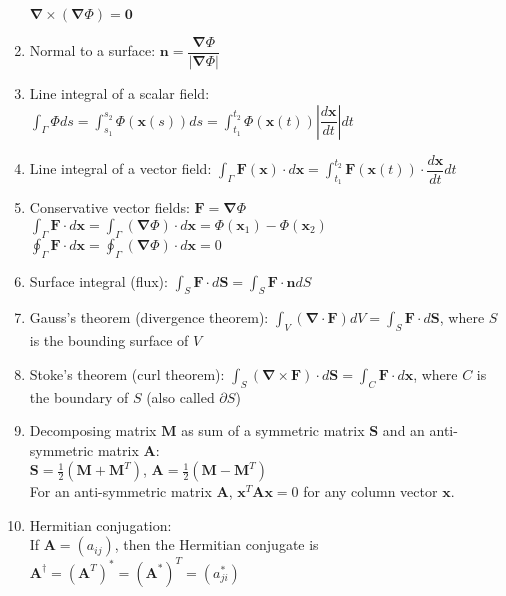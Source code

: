 \documentclass[fleqn]{article}
\begin{document}
\begin{enumerate}
        $\mathbf{\nabla}\times(\mathbf{\nabla}\Phi)=\mathbf{0}$
    \item Normal to a surface:\smallbreak
        $\mathbf{n}=\dfrac{\mathbf{\nabla}\Phi}{|\mathbf{\nabla}\Phi|}$
    \item Line integral of a scalar field:\smallbreak
        $\displaystyle\int_\Gamma\Phi ds=\displaystyle\int_{s_1}^{s_2}\Phi(\mathbf{x}(s))ds=\displaystyle\int_{t_1}^{t_2}\Phi(\mathbf{x}(t))\left|\dfrac{d\mathbf{x}}{dt}\right|dt$
    \item Line integral of a vector field:\smallbreak
        $\displaystyle\int_\Gamma\mathbf{F}(\mathbf{x})\cdot d\mathbf{x}=\displaystyle\int_{t_1}^{t_2}\mathbf{F}(\mathbf{x}(t))\cdot\dfrac{d\mathbf{x}}{dt}dt$
    \item Conservative vector fields: $\mathbf{F}=\mathbf{\nabla}\Phi$\smallbreak
        $\displaystyle\int_\Gamma\mathbf{F}\cdot d\mathbf{x}=\displaystyle\int_\Gamma(\mathbf{\nabla}\Phi)\cdot d\mathbf{x}=\Phi(\mathbf{x}_1)-\Phi(\mathbf{x}_2)$\smallbreak
        $\displaystyle\oint_\Gamma\mathbf{F}\cdot d\mathbf{x}=\displaystyle\oint_\Gamma(\mathbf{\nabla}\Phi)\cdot d\mathbf{x}=0$
    \item Surface integral (flux):\smallbreak
        $\displaystyle\int_S\mathbf{F}\cdot d\mathbf{S}=\displaystyle\int_S\mathbf{F}\cdot\mathbf{n}dS$
    \item Gauss's theorem (divergence theorem):\smallbreak
        $\displaystyle\int_V(\mathbf{\nabla}\cdot\mathbf{F})dV=\displaystyle\int_S\mathbf{F}\cdot d\mathbf{S}$, where $S$ is the bounding surface of $V$
    \item Stoke's theorem (curl theorem):\smallbreak
        $\displaystyle\int_S(\mathbf{\nabla}\times\mathbf{F})\cdot d\mathbf{S}=\displaystyle\int_C\mathbf{F}\cdot d\mathbf{x}$, where $C$ is the boundary of $S$ (also called $\partial S$)
    \newpage
    \item Decomposing matrix $\mathbf{M}$ as sum of a symmetric matrix $\mathbf{S}$ and an anti-symmetric matrix $\mathbf{A}$: \\
        $\mathbf{S}=\frac{1}{2}(\mathbf{M}+\mathbf{M}^T)$, $\mathbf{A}=\frac{1}{2}(\mathbf{M}-\mathbf{M}^T)$\\
        For an anti-symmetric matrix $\mathbf{A}$, $\mathbf{x}^T\mathbf{Ax}=0$ for any column vector $\mathbf{x}$.
    \item Hermitian conjugation:\\
        If $\mathbf{A}=(a_{ij})$, then the Hermitian conjugate is $\mathbf{A}^\dagger=(\mathbf{A}^T)^*=(\mathbf{A}^*)^T=(a^*_{ji})$\\

\end{enumerate}
\end{document}
